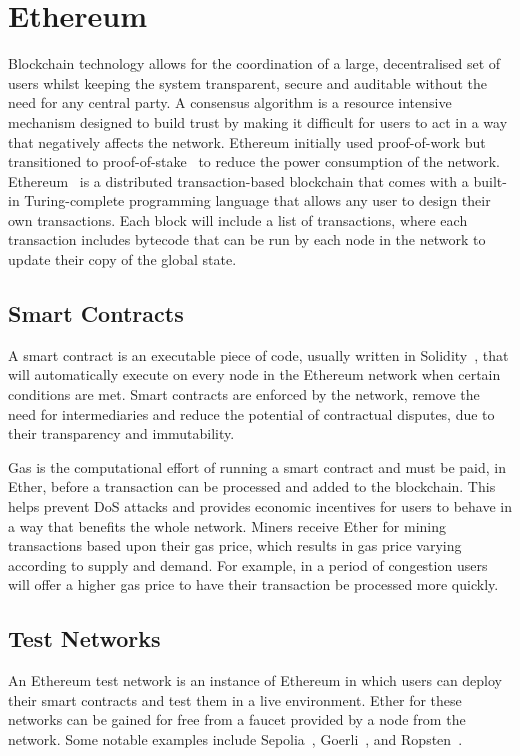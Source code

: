
\section{Ethereum}

Blockchain technology allows for the coordination of a large, decentralised set of users whilst keeping the system transparent, secure and auditable without the need for any central party. A consensus algorithm is a resource intensive mechanism designed to build trust by making it difficult for users to act in a way that negatively affects the network. Ethereum initially used proof-of-work but transitioned to proof-of-stake~\cite{kapengut_event_2023} to reduce the power consumption of the network.
\x
Ethereum~\cite{vujicic_blockchain_2018,dannen_introducing_2017} is a distributed transaction-based blockchain that comes with a built-in Turing-complete programming language that allows any user to design their own transactions. Each block will include a list of transactions, where each transaction includes bytecode that can be run by each node in the network to update their copy of the global state.

\subsection*{Smart Contracts}

A smart contract is an executable piece of code, usually written in Solidity~\cite{noauthor_solidity_nodate}, that will automatically execute on every node in the Ethereum network when certain conditions are met. Smart contracts are enforced by the network, remove the need for intermediaries and reduce the potential of contractual disputes, due to their transparency and immutability.

\vspace{2mm}
\noindent
Gas is the computational effort of running a smart contract and must be paid, in Ether, before a transaction can be processed and added to the blockchain. This helps prevent DoS attacks and provides economic incentives for users to behave in a way that benefits the whole network.
\x
Miners receive Ether for mining transactions based upon their gas price, which results in gas price varying according to supply and demand. For example, in a period of congestion users will offer a higher gas price to have their transaction be processed more quickly.

\subsection*{Test Networks}

An Ethereum test network is an instance of Ethereum in which users can deploy their smart contracts and test them in a live environment. Ether for these networks can be gained for free from a faucet provided by a node from the network. Some notable examples include Sepolia~\cite{noauthor_sepolia_nodate}, Goerli~\cite{noauthor_goerli_nodate}, and Ropsten~\cite{noauthor_ropsten_2023}.